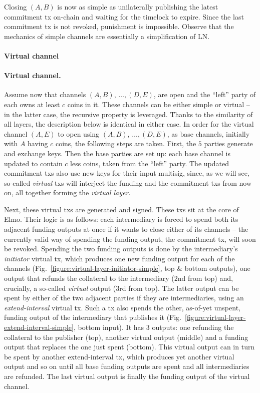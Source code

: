   Closing $(A, B)$ is now as simple as unilaterally publishing the latest
  commitment tx on-chain and waiting for the timelock to expire. Since the last
  commitment tx is not revoked, punishment is impossible. Observe that the
  mechanics of simple channels are essentially a simplification of LN.

  \makeatletter%
    {\paragraph{Virtual channel}}%
    {\paragraph{Virtual channel.}}%
  \makeatother%
  Assume now that channels $(A, B)$, $\dots,(D, E)$, are open and the ``left''
  party of each owns at least $c$ coins in it. These channels can be either
  simple or virtual -- in the latter case, the recursive property is leveraged.
  Thanks to the similarity of all layers, the description below is identical in
  either case. In order for the virtual channel $(A, E)$ to open using $(A, B)$,
  $\dots,(D, E)$, as base channels, initially with $A$ having $c$ coins, the
  following
  steps are taken. First, the $5$ parties generate and exchange keys. Then the
  base parties are set up: each base channel is updated to contain $c$ less
  coins, taken from the ``left'' party. The updated commitment txs also use new
  keys for their input multisig, since, as we will see, so-called \emph{virtual}
  txs will interject the funding and the commitment txs from now on, all
  together forming the \emph{virtual layer}.

  Next, these virtual txs are generated and signed. These txs sit at the core of
  Elmo. Their logic is as follows: each intermediary is forced to spend both its
  adjacent funding outputs at once if it wants to close either of its channels
  -- the currently valid way of spending the funding output, the commitment tx,
  will soon be revoked. Spending the two funding outputs is done by the
  intermediary's \emph{initiator} virtual tx, which produces one new funding
  output for each of the channels
  (Fig.~\ref{figure:virtual-layer-initiator-simple}, top \& bottom outputs), one
  output that refunds the collateral to the intermediary ($2$nd from top) and,
  crucially, a so-called \emph{virtual} output ($3$rd from top). The latter
  output can be spent by either of the two adjacent parties if they are
  intermediaries, using an \emph{extend-interval} virtual tx. Such a tx also
  spends the other, as-of-yet unspent, funding output of the intermediary that
  publishes it (Fig.~\ref{figure:virtual-layer-extend-interval-simple}, bottom
  input). It has $3$ outputs: one refunding the collateral to the publisher
  (top), another virtual output (middle) and a funding output that replaces the
  one just spent (bottom). This virtual output can in turn be spent by another
  extend-interval tx, which produces yet another virtual output and so on until
  all base funding outputs are spent and all intermediaries are refunded. The
  last virtual output is finally the funding output of the virtual channel.

